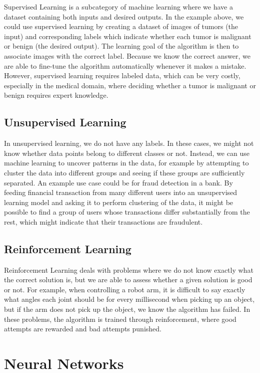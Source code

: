 \documentclass[UKenglish]{uiomasterthesis} %
\theoremstyle{definition}
\begin{document}
Supervised Learning is a subcategory of machine learning where we have a dataset containing both inputs and desired outputs. In the example above, we could use supervised learning by creating a dataset of images of tumors (the input) and corresponding labels which indicate whether each tumor is malignant or benign (the desired output). The learning goal of the algorithm is then to associate images with the correct label. Because we know the correct answer, we are able to fine-tune the algorithm automatically whenever it makes a mistake. However, supervised learning requires labeled data, which can be very costly, especially in the medical domain, where deciding whether a tumor is malignant or benign requires expert knowledge.

\subsection{Unsupervised Learning}

In unsupervised learning, we do not have any labels. In these cases, we might not know whether data points belong to different classes or not. Instead, we can use machine learning to uncover patterns in the data, for example by attempting to cluster the data into different groups and seeing if these groups are sufficiently separated. An example use case could be for fraud detection in a bank. By feeding financial transaction from many different users into an unsupervised learning model and asking it to perform clustering of the data, it might be possible to find a group of users whose transactions differ substantially from the rest, which might indicate that their transactions are fraudulent.

\subsection{Reinforcement Learning}

Reinforcement Learning deals with problems where we do not know exactly what the correct solution is, but we are able to assess whether a given solution is good or not. For example, when controlling a robot arm, it is difficult to say exactly what angles each joint should be for every millisecond when picking up an object, but if the arm does not pick up the object, we know the algorithm has failed. In these problems, the algorithm is trained through reinforcement, where good attempts are rewarded and bad attempts punished.

\section{Neural Networks}
\end{document}
